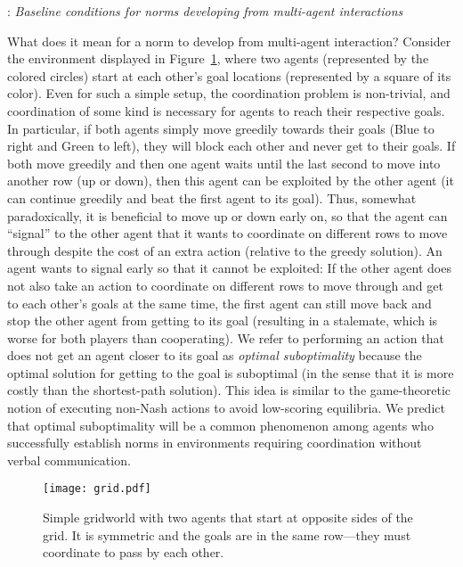\documentclass[12pt]{article}
\begin{document}

\vskip 0.05in

: {\em Baseline conditions for norms
  developing from multi-agent interactions}

\vskip 0.05in 
\noindent What does it mean for a norm to develop from multi-agent
interaction? Consider the environment displayed in
Figure~\ref{fig:grid}, where two agents (represented by the colored
circles) start at each other's goal locations (represented by a square
of its color).  Even for such a simple setup, the coordination problem
is non-trivial, and coordination of some kind is necessary for agents
to reach their respective goals. In particular, if both agents simply
move greedily towards their goals (Blue to right and Green to left),
they will block each other and never get to their goals.  If both move
greedily and then one agent waits until the last second to move into
another row (up or down), then this agent can be exploited by the
other agent (it can continue greedily and beat the first agent to its
goal). Thus, somewhat paradoxically, it is beneficial to move up or
down early on, so that the agent can ``signal'' to the other agent
that it wants to coordinate on different rows to move through despite
the cost of an extra action (relative to the greedy solution). An
agent wants to signal early so that it cannot be exploited: If the
other agent does not also take an action to coordinate on different
rows to move through and get to each other's goals at the same time,
the first agent can still move back and stop the other agent from
getting to its goal (resulting in a stalemate, which is worse for both
players than cooperating). We refer to performing an action that does
not get an agent closer to its goal as {\em optimal suboptimality}
because the optimal solution for getting to the goal is suboptimal (in
the sense that it is more costly than the shortest-path
solution). This idea is similar to the game-theoretic notion of
executing non-Nash actions to avoid low-scoring equilibria. We predict
that optimal suboptimality will be a common phenomenon among agents
who successfully establish norms in environments requiring
coordination without verbal communication.

\begin{figure}[h!]
 \centering
 \texttt{[image: grid.pdf]}
 \caption{\small Simple gridworld with two agents that start at
   opposite sides of the grid. It is symmetric and the goals are in
   the same row---they must coordinate to pass by each other.}
 \label{fig:grid}
\end{figure}
\end{document}
